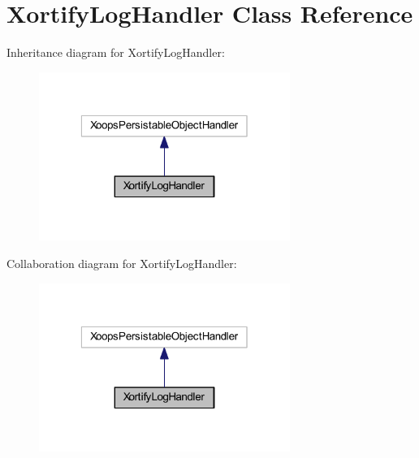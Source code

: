 \hypertarget{class_xortify_log_handler}{\section{Xortify\-Log\-Handler Class Reference}
\label{class_xortify_log_handler}
}


Inheritance diagram for Xortify\-Log\-Handler\-:
\nopagebreak
\begin{figure}[H]
\begin{center}
\leavevmode
\includegraphics[width=232pt]{class_xortify_log_handler__inherit__graph}
\end{center}
\end{figure}


Collaboration diagram for Xortify\-Log\-Handler\-:
\nopagebreak
\begin{figure}[H]
\begin{center}
\leavevmode
\includegraphics[width=232pt]{class_xortify_log_handler__coll__graph}
\end{center}
\end{figure}
